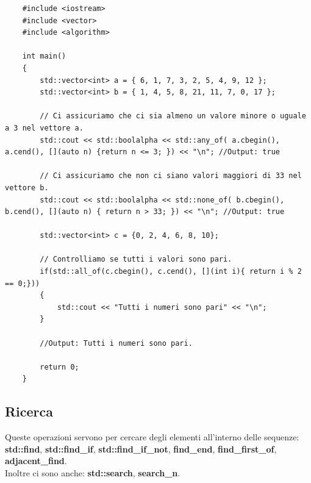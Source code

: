 \begin{lstlisting}
	#include <iostream>
	#include <vector>
	#include <algorithm>
	
	int main()
	{
		std::vector<int> a = { 6, 1, 7, 3, 2, 5, 4, 9, 12 };
		std::vector<int> b = { 1, 4, 5, 8, 21, 11, 7, 0, 17 };
		
		// Ci assicuriamo che ci sia almeno un valore minore o uguale a 3 nel vettore a.
		std::cout << std::boolalpha << std::any_of( a.cbegin(), a.cend(), [](auto n) {return n <= 3; }) << "\n"; //Output: true
		
		// Ci assicuriamo che non ci siano valori maggiori di 33 nel vettore b.
		std::cout << std::boolalpha << std::none_of( b.cbegin(), b.cend(), [](auto n) { return n > 33; }) << "\n"; //Output: true
		
		std::vector<int> c = {0, 2, 4, 6, 8, 10};
		
		// Controlliamo se tutti i valori sono pari.
		if(std::all_of(c.cbegin(), c.cend(), [](int i){ return i % 2 == 0;}))
		{
			std::cout << "Tutti i numeri sono pari" << "\n";
		}
	
		//Output: Tutti i numeri sono pari.
		
		return 0;
	}	
\end{lstlisting}

\subsection{Ricerca}

\textsf{\small Queste operazioni servono per cercare degli elementi all'interno delle sequenze: \textbf{std::find}, \textbf{std::find\_if}, \textbf{std::find\_if\_not}, \textbf{find\_end}, \textbf{find\_first\_of}, \textbf{adjacent\_find}.} \\

\textsf{\small Inoltre ci sono anche: \textbf{std::search}, \textbf{search\_n}.} \\

